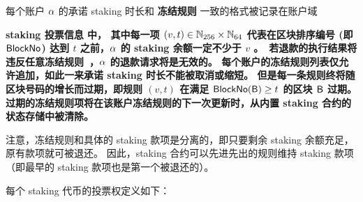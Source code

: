 每个账户 $\mathbf{\alpha}$ 的承诺 staking 时长和 {\bf 冻结规则} 一致的格式被记录在账户域 {\bf staking 投票信息 中，
其中每一项 $(v,t)\in \mathbb{N}_{256}\times\mathbb{N}_{64}$ 代表在区块排序编号 (即 $\mathsf{BlockNo}$) 达到 $t$ 之前，$\mathbf{\alpha}$ 的 staking 余额一定不少于 $v$ \unit。
若退款的执行结果将违反任意冻结规则，$\mathbf{\alpha}$ 的退款请求将是无效的。
每个账户的冻结规则列表仅允许追加，如此一来承诺 staking 时长不能被取消或缩短。
但是每一条规则终将随区块号码的增长而过期，即规则 $(v,t)$ 在满足 $\mathsf{BlockNo}(\textsf{B})\ge t$ 的区块 $\textsf{B}$ 过期。
过期的冻结规则项将在该账户冻结规则的下一次更新时，从内置 staking 合约的状态存储中被清除。

注意，冻结规则和具体的 staking 款项是分离的，即只要剩余 staking 余额充足，原有款项就可被退还。
因此，staking 合约可以先进先出的规则维持 staking 款项（即最早的 staking 款项也是第一个被退还的）。


每个 staking 代币的投票权定义如下：

}
